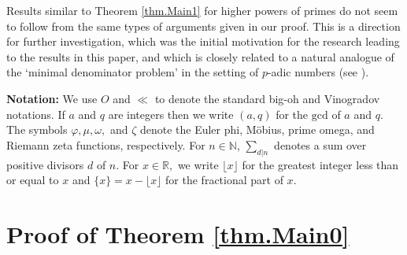 \documentclass[reqno]{amsart}
\newcommand{\N}{\mathbb{N}}
\newcommand{\R}{\mathbb{R}}
\begin{document}
Results similar to Theorem \ref{thm.Main1} for higher powers of primes do not seem to follow from the same types of arguments given in our proof. This is a direction for further investigation, which was the initial motivation for the research leading to the results in this paper, and which is closely related to a natural analogue of the `minimal denominator problem' in the setting of $p$-adic numbers (see \cite{ChenHayn2023,Mark2024,Shpa2024}).


\noindent \textbf{Notation:} We use $O$ and $\ll$ to denote the standard big-oh and Vinogradov notations. If $a$ and $q$ are integers then we write $(a,q)$ for the $\mathrm{gcd}$ of $a$ and $q$.
The symbols $\varphi,\mu,\omega,$ and $\zeta$ denote the Euler phi, M\"obius, prime omega, and Riemann zeta functions, respectively. For $n\in\N$, $\sum_{d|n}$ denotes a sum over positive divisors $d$ of $n$. For $x\in\R,$ we write $\lfloor x\rfloor$ for the greatest integer less than or equal to $x$ and $\{x\}=x-\lfloor x\rfloor$ for the fractional part of $x$.

\section{Proof of Theorem \ref{thm.Main0}}
\end{document}

